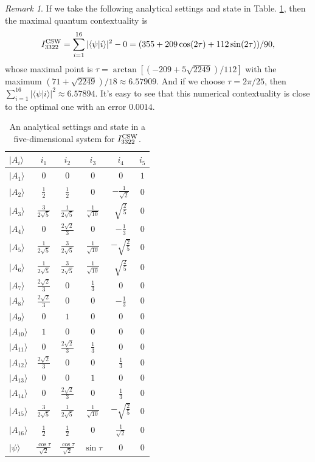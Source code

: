 \documentclass[pra,aps,notitlepage,superscriptaddress,showpacs,showkeys]{revtex4-1}
\theoremstyle{definition}
\theoremstyle{remark}
\newtheorem{remark}{Remark}
\begin{document}
\begin{remark}
If we take the following analytical settings and state in Table. \ref{analytical}, then  the maximal quantum contextuality  is
\[
I_{3322}^{\rm CSW} = \sum_{i=1}^{16} |\langle \psi|i\rangle|^2 -0= (355+209\cos(2\tau)+112\sin(2\tau))/90,
\]
whose maximal point is $\tau = \arctan[(-209 + 5 \sqrt{2249})/112]$ with the maximum $\left(71+\sqrt{2249}\right)/18 \approx 6.57909$.
And if we choose $\tau = 2\pi/25$, then $\sum_{i=1}^{16} |\langle \psi|i\rangle|^2 \approx 6.57894$. It's easy to see that this numerical contextuality is close to the optimal one with an error $0.0014$.
\begin{table}[t]
\centering
\caption{An analytical settings and state in a five-dimensional system for $I_{3322}^{\rm CSW}$.}
  \begin{tabular}{lccccc} \hline \hline
$|A_i\rangle$ & $i_1$ & $i_2$ & $i_3$ & $i_4$ & $i_5$ \\
\hline
$|A_1\rangle$  & $0$ & $0$ & $0$ & $0$ & $1$ \\
$|A_2\rangle$  & $\frac{1}{2}$ & $\frac{1}{2}$ & $0$ & $-\frac{1}{\sqrt{2}}$ & $0$ \\
$|A_3\rangle$  & $\frac{3}{2 \sqrt{5}}$ & $\frac{1}{2 \sqrt{5}}$ & $\frac{1}{\sqrt{10}}$ & $\sqrt{\frac{2}{5}}$ & $0$ \\
$|A_4\rangle$  & $0$ & $\frac{2 \sqrt{2}}{3}$ & $0$ & $-\frac{1}{3}$ & $0$ \\
$|A_5\rangle$  & $\frac{1}{2 \sqrt{5}}$ & $\frac{3}{2 \sqrt{5}}$ & $\frac{1}{\sqrt{10}}$ & $-\sqrt{\frac{2}{5}}$ & $0$ \\
$|A_6\rangle$  & $\frac{1}{2 \sqrt{5}}$ & $\frac{3}{2 \sqrt{5}}$ & $\frac{1}{\sqrt{10}}$ & $\sqrt{\frac{2}{5}}$ & $0$ \\
$|A_7\rangle$  & $\frac{2 \sqrt{2}}{3}$ & $0$ & $\frac{1}{3}$ & $0$ & $0$ \\
$|A_8\rangle$  & $\frac{2 \sqrt{2}}{3}$ & $0$ & $0$ & $-\frac{1}{3}$ & $0$ \\
$|A_9\rangle$  & $0$ & $1$ & $0$ & $0$ & $0$ \\
$|A_{10}\rangle$ & $1$ & $0$ & $0$ & $0$ & $0$ \\
$|A_{11}\rangle$ & $0$ & $\frac{2 \sqrt{2}}{3}$ & $\frac{1}{3}$ & $0$ & $0$ \\
$|A_{12}\rangle$ & $\frac{2 \sqrt{2}}{3}$ & $0$ & $0$ & $\frac{1}{3}$ & $0$ \\
$|A_{13}\rangle$ & $0$ & $0$ & $1$ & $0$ & $0$ \\
$|A_{14}\rangle$ & $0$ & $\frac{2 \sqrt{2}}{3}$ & $0$ & $\frac{1}{3}$ & $0$ \\
$|A_{15}\rangle$ & $\frac{3}{2 \sqrt{5}}$ & $\frac{1}{2 \sqrt{5}}$ & $\frac{1}{\sqrt{10}}$ & $-\sqrt{\frac{2}{5}}$ & $0$  \\
$|A_{16}\rangle$ & $\frac{1}{2}$ & $\frac{1}{2}$ & $0$ & $\frac{1}{\sqrt{2}}$ & $0$ \\
\hline
$|\psi\rangle$ & $\frac{\cos\tau}{\sqrt{2}}$ & $\frac{\cos\tau}{\sqrt{2}}$ & $\sin\tau$ & $0$ & $0$ \\
  \hline \hline
   \end{tabular}
\label{analytical}
\end{table}
\end{remark}
\end{document}
